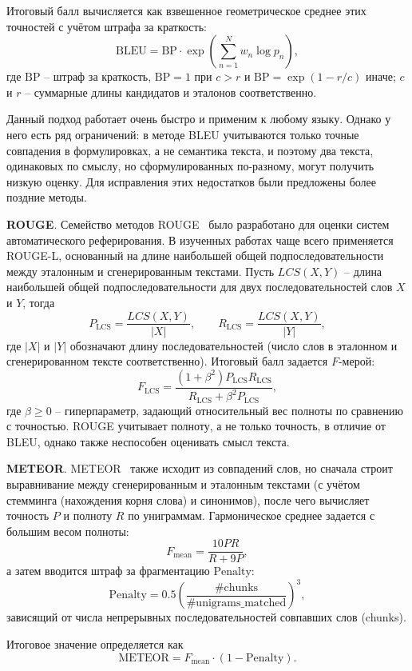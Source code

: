Итоговый балл вычисляется как взвешенное геометрическое среднее этих точностей с учётом штрафа за краткость:
\[
\mathrm{BLEU} = \mathrm{BP} \cdot \exp\left(\sum_{n=1}^{N} w_n \log p_n \right),
\]
где $\mathrm{BP}$ -- штраф за краткость, $\mathrm{BP}=1$ при $c>r$ и $\mathrm{BP}=\exp(1-r/c)$ иначе; $c$ и $r$ -- суммарные длины кандидатов и эталонов соответственно.

Данный подход работает очень быстро и применим к любому языку. Однако у него есть ряд ограничений: в методе BLEU учитываются только точные совпадения в формулировках, а не семантика текста, и поэтому два текста, одинаковых по смыслу, но сформулированных по-разному, могут получить низкую оценку. Для исправления этих недостатков были предложены более поздние методы.

\textbf{ROUGE}. Семейство методов ROUGE~\cite{lin2004rouge} было разработано для оценки систем автоматического реферирования. В изученных работах чаще всего применяется ROUGE-L, основанный на длине наибольшей общей подпоследовательности между эталонным и сгенерированным текстами. Пусть $LCS(X,Y)$ -- длина наибольшей общей подпоследовательности для двух последовательностей слов $X$ и $Y$, тогда
    \[
    P_{\text{LCS}} = \frac{LCS(X,Y)}{|X|}, \qquad
    R_{\text{LCS}} = \frac{LCS(X,Y)}{|Y|},
    \]
    где $|X|$ и $|Y|$ обозначают длину последовательностей (число слов в эталонном и сгенерированном тексте соответственно). Итоговый балл задается $F$-мерой:
    \[
    F_{\text{LCS}} = \frac{(1+\beta^2)P_{\text{LCS}}R_{\text{LCS}}}{R_{\text{LCS}} + \beta^2 P_{\text{LCS}}},
    \]
    где $\beta \geq 0$ -- гиперпараметр, задающий относительный вес полноты по сравнению с точностью. ROUGE учитывает полноту, а не только точность, в отличие от BLEU, однако также неспособен оценивать смысл текста.

\textbf{METEOR}. METEOR~\cite{banerjee2005meteor} также исходит из совпадений слов, но сначала строит выравнивание между сгенерированным и эталонным текстами (с учётом стемминга (нахождения корня слова) и синонимов), после чего вычисляет точность $P$ и полноту $R$ по униграммам. Гармоническое среднее задается с большим весом полноты:
    \[
    F_{\mathrm{mean}} = \frac{10PR}{R + 9P},
    \]
    а затем вводится штраф за фрагментацию $\mathrm{Penalty}$:
    \[
    \mathrm{Penalty} = 0.5 \left( \frac{\#\text{chunks}}{\#\text{unigrams\_matched}} \right)^3,
    \]
    зависящий от числа непрерывных последовательностей совпавших слов (chunks). 
    
    Итоговое значение определяется как
    \[
    \mathrm{METEOR} = F_{\mathrm{mean}} \cdot (1 - \mathrm{Penalty}).
    \]
    
